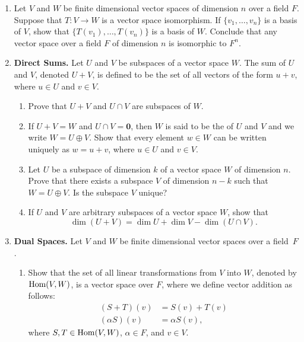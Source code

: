 {\begin{enumerate}
\begin{enumerate}
\end{enumerate}


\item
Let $V$ and $W$ be finite dimensional vector spaces of dimension $n$
over a field $F$. Suppose that  $T: V \rightarrow W$ is a vector space
isomorphism.  If $\{ v_1, \ldots, v_n \}$ is a basis of $V$, show that
$\{ T(v_1), \ldots, T(v_n) \}$ is a basis of $W$. Conclude that any
vector space over a field $F$ of dimension $n$ is isomorphic to $F^n$. 


\item
\textbf{Direct Sums.} 
Let $U$ and $V$ be subspaces of a vector space $W$. The sum of $U$ and
$V$, denoted $U + V$, is defined to be the set of all vectors of the
form $u + v$, where $u \in U$ and $v \in V$. 
\begin{enumerate}

   \item
Prove that $U + V$ and $U \cap V$ are subspaces of $W$.

   \item
If $U + V = W$ and $U \cap V = {\mathbf 0}$, then $W$ is said to be the
 of $U$ and $V$ and we write $W = U \oplus
V$\label{notedirectsum}.
Show that every element $w \in W$ can be written uniquely as $w = u +
v$, where $u \in U$ and $v \in V$.

   \item
Let $U$ be a subspace of dimension $k$ of a vector space $W$ of
dimension $n$. Prove that there exists a subspace $V$ of dimension
$n-k$ such that $W = U \oplus V$.  Is the subspace $V$ unique?

   \item
If $U$ and $V$ are arbitrary subspaces of a vector space $W$, show
that 
\[
\dim( U + V) = \dim U + \dim V - \dim( U \cap V).
\]

\end{enumerate}


\item
\textbf{Dual Spaces.} 
Let $V$ and $W$ be finite dimensional vector spaces over a field~$F$. 
\begin{enumerate}

   \item
Show that the set of all linear transformations from $V$ into $W$,
denoted by $\operatorname{Hom}(V, W)$\label{noteHom}, 
is a vector space over $F$, where we
define vector addition as follows:
\begin{align*}
(S + T)(v) &=  S(v) +T(v) \\
(\alpha S)(v) & =  \alpha S(v),
\end{align*}
where $S, T \in \operatorname{Hom}(V, W)$, $\alpha \in F$, and $v \in V$.
 

\end{enumerate}
\end{enumerate}}
